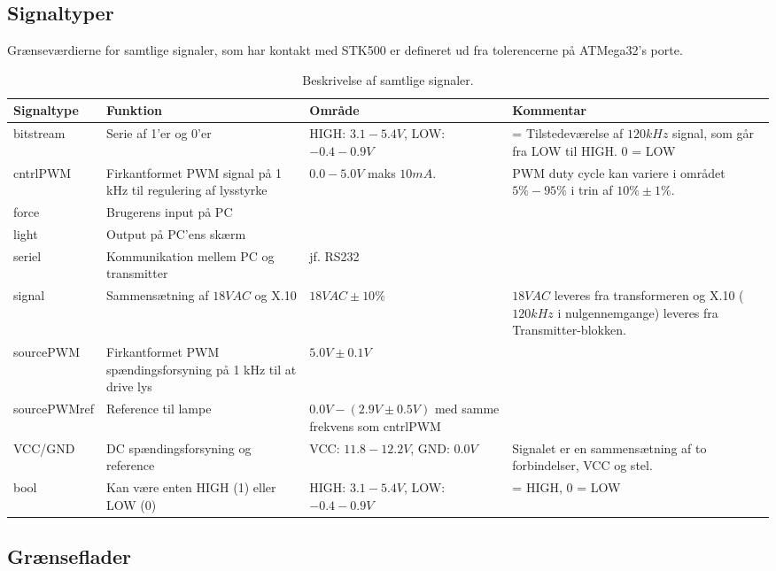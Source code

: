 \subsection{Signaltyper}
Grænseværdierne for samtlige signaler, som har kontakt med STK500 er defineret ud fra tolerencerne på ATMega32's porte\cite{lib:AtMega32}.
\begin{table}[h]
\centering
\begin{tabularx}{\textwidth}{| l | >{\raggedright}X | >{\raggedright}X | >{\raggedright\arraybackslash}X |}
\hline
	Signaltype & Funktion & Område & Kommentar \\ \hline
	bitstream & Serie af 1'er og 0'er & HIGH: $3.1 - 5.4V$, LOW: $-0.4 - 0.9V$ & 1 = Tilstedeværelse af $120 kHz$ signal, som går fra LOW til HIGH. 0 = LOW \\ \hline
	cntrlPWM & Firkantformet PWM signal på 1 kHz til regulering af lysstyrke & $0.0 - 5.0 V$ maks $10 mA$.  & PWM duty cycle kan variere i området $5\%-95\%$ i trin af $10\% \pm 1\%$.  \\ \hline
	force & Brugerens input på PC & \  & \  \\ \hline
	light & Output på PC'ens skærm & \  & \  \\ \hline
	seriel & Kommunikation mellem PC og transmitter & jf. RS232 & \  \\ \hline
	signal & Sammensætning af $18V AC$  og X.10 & $18V AC \pm 10\%$ \cite{lib:Adaptor} & $18V AC$ leveres fra transformeren og X.10 ($120 kHz$ i nulgennemgange) leveres fra Transmitter-blokken.  \\ \hline
	sourcePWM & Firkantformet PWM spændingsforsyning på 1 kHz til at drive lys & $5.0V \pm 0.1V$ & \\ \hline	
	sourcePWMref & Reference til lampe & $0.0V - (2.9V \pm 0.5V)$ med samme frekvens som cntrlPWM & \\ \hline
	VCC/GND & DC spændingsforsyning og reference & VCC: $11.8 - 12.2V$, GND: $0.0V$ & Signalet er en sammensætning af to forbindelser, VCC og stel. \\ \hline
	bool & Kan være enten HIGH (1) eller LOW (0) & HIGH: $3.1 - 5.4V$, LOW: $-0.4 - 0.9V$ & 1 = HIGH, 0 = LOW \\ \hline
\end{tabularx}
\caption{Beskrivelse af samtlige signaler.}
\label{tbl:signalbeskriv}
\end{table}
\clearpage
\subsection{Grænseflader}

